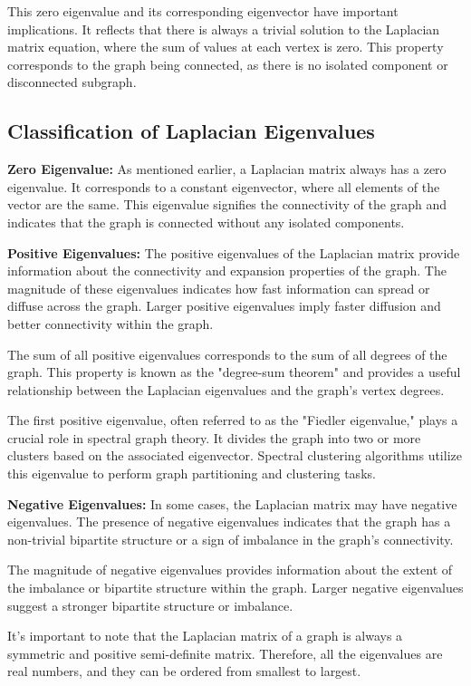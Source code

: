 \documentclass{article}
\begin{document}
This zero eigenvalue and its corresponding eigenvector have important implications. It reflects that there is always a trivial solution to the Laplacian matrix equation, where the sum of values at each vertex is zero. This property corresponds to the graph being connected, as there is no isolated component or disconnected subgraph.

\subsection*{Classification of Laplacian Eigenvalues}

\textbf{Zero Eigenvalue:} As mentioned earlier, a Laplacian matrix always has a zero eigenvalue. It corresponds to a constant eigenvector, where all elements of the vector are the same. This eigenvalue signifies the connectivity of the graph and indicates that the graph is connected without any isolated components.

\textbf{Positive Eigenvalues:} The positive eigenvalues of the Laplacian matrix provide information about the connectivity and expansion properties of the graph. The magnitude of these eigenvalues indicates how fast information can spread or diffuse across the graph. Larger positive eigenvalues imply faster diffusion and better connectivity within the graph.

The sum of all positive eigenvalues corresponds to the sum of all degrees of the graph. This property is known as the "degree-sum theorem" and provides a useful relationship between the Laplacian eigenvalues and the graph's vertex degrees.

The first positive eigenvalue, often referred to as the "Fiedler eigenvalue," plays a crucial role in spectral graph theory. It divides the graph into two or more clusters based on the associated eigenvector. Spectral clustering algorithms utilize this eigenvalue to perform graph partitioning and clustering tasks.

\textbf{Negative Eigenvalues:} In some cases, the Laplacian matrix may have negative eigenvalues. The presence of negative eigenvalues indicates that the graph has a non-trivial bipartite structure or a sign of imbalance in the graph's connectivity.

The magnitude of negative eigenvalues provides information about the extent of the imbalance or bipartite structure within the graph. Larger negative eigenvalues suggest a stronger bipartite structure or imbalance.

It's important to note that the Laplacian matrix of a graph is always a symmetric and positive semi-definite matrix. Therefore, all the eigenvalues are real numbers, and they can be ordered from smallest to largest.
\end{document}
